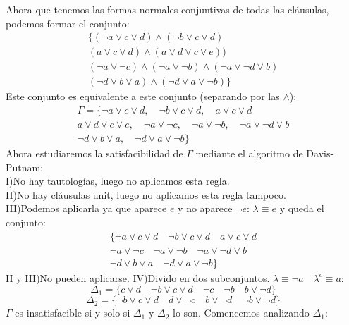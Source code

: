 \documentclass[a4paper]{article}
\begin{document}
Ahora que tenemos las formas normales conjuntivas de todas las cláusulas, podemos formar el conjunto:
\begin{equation*}
\begin{split}
\{(\neg a\lor c\lor d) \land (\neg b\lor c \lor d)\\(a\lor c\lor d)\land(a\lor d\lor c\lor e))\\ (\neg a\lor\neg c)\land(\neg a\lor \neg b)\land(\neg a\lor\neg d\lor b)\\ (\neg d\lor b\lor a)\land(\neg d\lor a\lor\neg b)\}
\end{split}
\end{equation*}
Este conjunto es equivalente a este conjunto (separando por las $\land$):
\begin{equation*}
\begin{split}
\Gamma=\{\neg a\lor c\lor d, \quad \neg b\lor c \lor d,\quad a\lor c\lor d\\a\lor d\lor c\lor e,\quad \neg a\lor\neg c,\quad\neg a\lor \neg b,\quad\neg a\lor\neg d\lor b\\ \neg d\lor b\lor a,\quad \neg d\lor a\lor\neg b \}
\end{split}
\end{equation*}
Ahora estudiaremos la satisfacibilidad de  $\Gamma$ mediante el algoritmo de Davis-Putnam:\\
I)No hay tautologías, luego no aplicamos esta regla.\\
II)No hay cláusulas unit, luego no aplicamos esta regla tampoco.\\
III)Podemos aplicarla ya que aparece $e$ y no aparece $\neg e$: $\lambda\equiv e$ y queda el conjunto:
\begin{equation}
\begin{split}
\{\neg a\lor c\lor d \quad \neg b\lor c \lor d\quad a\lor c\lor d\\ \neg a\lor\neg c\quad\neg a\lor \neg b\quad\neg a\lor\neg d\lor b\\ \neg d\lor b\lor a\quad \neg d\lor a\lor\neg b \}
\end{split}
\end{equation}
II y III)No pueden aplicarse.
IV)Divido en dos subconjuntos. $\lambda\equiv\neg a \quad \lambda^c\equiv a$:
$$\Delta_1=\{c\lor d\quad \neg b\lor c\lor d\quad\neg c\quad\neg b\quad b\lor\neg d\}$$
$$\Delta_2=\{\neg b\lor c\lor d\quad d\lor\neg c\quad b\lor\neg d\quad\neg b\lor\neg d\}$$
$\Gamma$ es insatisfacible si y solo si $\Delta_1$ y $\Delta_2$ lo son. Comencemos analizando $\Delta_1$:\\
\end{document}
